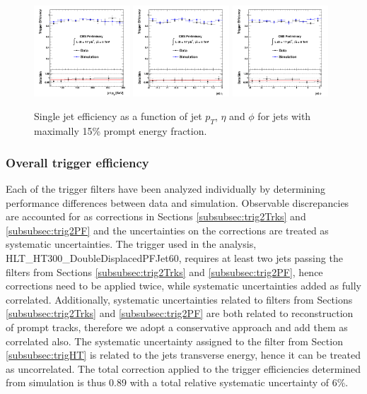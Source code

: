 \begin{figure}[!h]
\centering
 \includegraphics[width=0.32\textwidth]{plots/trigger/effHT300_PF_Pt.pdf}
 \includegraphics[width=0.32\textwidth]{plots/trigger/effHT300_PF_Eta.pdf}
 \includegraphics[width=0.32\textwidth]{plots/trigger/effHT300_PF_Phi.pdf}
\caption{Single jet efficiency as a function of jet $p_T$, $\eta$ and $\phi$ for jets with maximally 15\% prompt energy fraction. \label{fig:eff2PFptetaphi}}
\end{figure}

\subsubsection{Overall trigger efficiency}

Each of the trigger filters have been analyzed individually by determining performance differences 
between data and simulation. Observable discrepancies are accounted for as corrections in Sections
 \ref{subsubsec:trig2Trks} and \ref{subsubsec:trig2PF} and the uncertainties on the corrections are treated as 
systematic uncertainties. The trigger used in the analysis, HLT\_HT300\_DoubleDisplacedPFJet60, requires
 at least two jets passing the filters from Sections \ref{subsubsec:trig2Trks} and \ref{subsubsec:trig2PF}, 
hence corrections need to be applied twice, while systematic uncertainties added as fully correlated. 
Additionally, systematic uncertainties related to filters from Sections 
\ref{subsubsec:trig2Trks} and \ref{subsubsec:trig2PF} are both related to reconstruction of prompt tracks, therefore
 we adopt a conservative approach and add them as correlated also. The systematic uncertainty assigned to 
the filter from Section 
\ref{subsubsec:trigHT} is related to the jets transverse energy, hence it can be treated as uncorrelated. 
The total correction applied to the trigger efficiencies determined from simulation is thus 0.89 with a total
relative systematic uncertainty of 6\%. 

